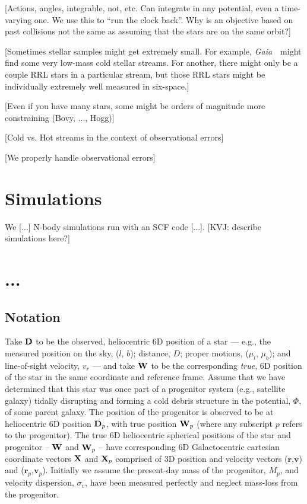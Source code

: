 \documentclass[letterpaper,12pt,preprint]{aastex}
\newcommand{\project}[1]{\textsl{#1}}
\newcommand{\gaia}{\project{Gaia}~}
\newcommand{\D}{{\bf D}}
\newcommand{\W}{{\bf W}}
\newcommand{\X}{{\bf X}}
\newcommand{\bsr}{\boldsymbol r}
\newcommand{\bsv}{\boldsymbol v}
\begin{document}
[Actions, angles, integrable, not, etc.  Can integrate in any
  potential, even a time-varying one. We use this to
  ``run the clock back''.  Why is an objective based on past collisions not the
  same as assuming that the stars are on the same orbit?]

[Sometimes stellar samples might get extremely small.  For example,
  \gaia\ might find some very low-mass cold stellar streams.  For
  another, there might only be a couple RRL stars in a particular
  stream, but those RRL stars might be individually extremely well
  measured in six-space.]

[Even if you have many stars, some might be orders of magnitude more constraining (Bovy, ..., Hogg)]

[Cold vs. Hot streams in the context of observational errors]

[We properly handle observational errors]

\section{Simulations}\label{sec:sims}

We [...] N-body simulations run with an SCF code [...]. [KVJ: describe simulations here?]

\section{...}

\subsection{Notation}
Take $\D$ to be the observed, heliocentric 6D position of a star --- e.g., the measured position on the sky, ($l$, $b$); distance, $D$; proper motions, ($\mu_l$, $\mu_b$); and line-of-sight velocity, $v_r$ --- and take $\W$ to be the corresponding \emph{true}, 6D position of the star in the same coordinate and reference frame. Assume that we have determined that this star was once part of a progenitor system (e.g., satellite galaxy) tidally disrupting and forming a cold debris structure in the potential, $\Phi$, of some parent galaxy. The position of the progenitor is observed to be at heliocentric 6D position $\D_p$, with true position $\W_p$ (where any subscript $p$ refers to the progenitor). The true 6D heliocentric spherical positions of the star and progenitor -- $\W$ and $\W_p$ -- have corresponding 6D Galactocentric cartesian coordinate vectors $\X$ and $\X_p$ comprised of 3D position and velocity vectors ($\bsr$,$\bsv$) and ($\bsr_p$,$\bsv_p$). Initially we assume the present-day mass of the progenitor, $M_p$, and velocity dispersion, $\sigma_v$, have been measured perfectly and neglect mass-loss from the progenitor. 
\end{document}
